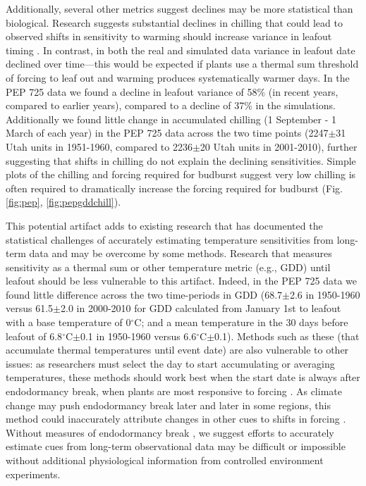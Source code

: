 \documentclass{article}
\begin{document}
\par Additionally, several other metrics suggest declines may be more statistical than biological. Research suggests substantial declines in chilling that could lead to observed shifts in sensitivity to warming should increase variance in leafout timing \citep{ford2016}. In contrast, in both the real and simulated data variance in leafout date declined over time---this would be expected if plants use a thermal sum threshold of forcing to leaf out and warming produces systematically warmer days. In the PEP 725 data we found a decline in leafout variance of 58\% (in recent years, compared to earlier years), compared to a decline of 37\% in the simulations. Additionally we found little change in accumulated chilling (1 September - 1 March of each year) in the PEP 725 data across the two time points (2247$\pm$31 Utah units in 1951-1960, compared to 2236$\pm$20 Utah units in 2001-2010), further suggesting that shifts in chilling do not explain the declining sensitivities. Simple plots of the chilling and forcing required for budburst suggest very low chilling is often required to dramatically increase the forcing required for budburst (Fig. \ref{fig:pep}, \ref{fig:pepgddchill}). 

\par This potential artifact adds to existing research that has documented the statistical challenges of accurately estimating temperature sensitivities from long-term data \citep{gusewell2017,clark2014a} and may be overcome by some methods. Research that measures sensitivity as a thermal sum or other temperature metric (e.g., GDD) until leafout should be less vulnerable to this artifact. Indeed, in the PEP 725 data we found little difference across the two time-periods in GDD (68.7$\pm$2.6 in 1950-1960 versus 61.5$\pm$2.0 in 2000-2010 for GDD calculated from January 1st to leafout with a base temperature of 0$^{\circ}$C; and a mean temperature in the 30 days before leafout of 6.8$^{\circ}$C$\pm$0.1 in 1950-1960 versus 6.6$^{\circ}$C$\pm$0.1). Methods such as these (that accumulate thermal temperatures until event date) are also vulnerable to other issues: as researchers must select the day to start accumulating or averaging temperatures, these methods should work best when the start date is always after endodormancy break, when plants are most responsive to forcing \citep{chuine2016}. As climate change may push endodormancy break later and later in some regions, this method could inaccurately attribute changes in other cues to shifts in forcing \citep{gusewell2017}. Without measures of endodormancy break \citep{chuine2016}, we suggest efforts to accurately estimate cues from long-term observational data may be difficult or impossible without additional physiological information from controlled environment experiments.
\end{document}
